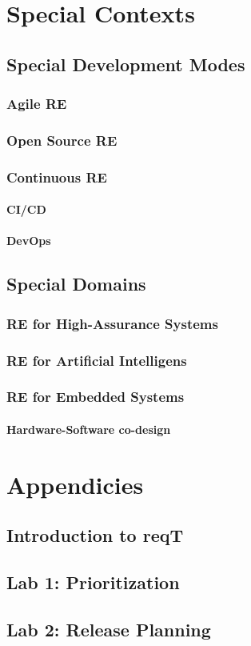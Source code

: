 \documentclass{reqengbook}
\begin{document}
\part{Special Contexts}

\chapter{Special Development Modes}

\section{Agile RE}

\section{Open Source RE}

\section{Continuous RE}

\subsection{CI/CD}
\subsection{DevOps}

\chapter{Special Domains}

\section{RE for High-Assurance Systems}

\section{RE for Artificial Intelligens}

\section{RE for Embedded Systems}
\subsection{Hardware-Software co-design}

\part{Appendicies}\appendix

\chapter{Introduction to reqT}

\chapter{Lab 1: Prioritization}

\chapter{Lab 2: Release Planning}
\end{document}
